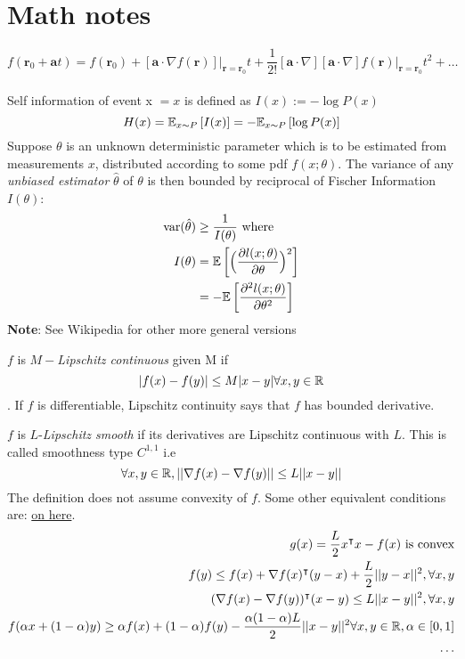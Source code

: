   \section{Math notes}
  \begin{equation}
    f(\boldsymbol{r}_0+\boldsymbol{a}t) = f(\boldsymbol{r}_0) +  [\boldsymbol{a}
      \cdot \nabla f(\boldsymbol{r})] \Big|_{\boldsymbol{r}=\boldsymbol{r}_0}t 
        + \frac{1}{2!} [\boldsymbol{a} \cdot \nabla][\boldsymbol{a} \cdot
          \nabla]f(\boldsymbol{r}) \Big|_{\boldsymbol{r}=
            \boldsymbol{r}_0} t^2 + \ldots
  \end{equation}
   \\
  Self information of event x $= x$ is defined as $I(x) := -\log P(x)$
  $$
  H(x) = \mathbb{E}_{x \sim P}\left[I(x)\right] = -\mathbb{E}_{x \sim P}\left[\log P(x)\right]
  $$
   \cite{math-stat16} 
  Suppose $\theta$ is an unknown deterministic parameter which is to be estimated from
  measurements $x$, distributed according to some pdf $f(x; \theta)$. The variance of any 
  \textit{unbiased estimator} $\hat{\theta}$ of $\theta$ is then bounded by reciprocal of
  Fischer Information $I(\theta)$:
  \begin{align}
    \text{var}(\hat{\theta}) &\geq \frac{1}{I(\theta)} \text{ where }\nonumber\\
    I(\theta) &= \mathbb{E}\left[\Big(\frac{\partial l(x; \theta)}{\partial \theta}\Big)^2\right] \nonumber\\
         &= -\mathbb{E}\left[\frac{\partial^2 l(x; \theta)}{\partial \theta^2}\right] \nonumber
  \end{align}
  {\bf Note}: See Wikipedia for other more general versions

  $f$ is $M-$\emph{Lipschitz continuous} given M if 
  $$|f(x) - f(y)| \leq M|x-y| \forall x,y \in \mathbb{R}$$. 
  If $f$ is differentiable, Lipschitz continuity
  says that $f$ has bounded derivative. 

  $f$ is $L$-\emph{Lipschitz smooth} if its derivatives are Lipschitz continuous
  with $L$. This is called smoothness type $C^{1,1}$ i.e 
  $$\forall x, y \in \mathbb{R}, ||\nabla f(x) - \nabla f(y)|| \leq L||x-y||$$
  The definition does not assume convexity of $f$. Some other equivalent conditions
  are: \href{https://xingyuzhou.org/blog/notes/Lipschitz-gradient}{on here}.
  \begin{align}
    g(x) = \frac{L}{2}x^\intercal x - f(x) \text{ is convex} \\
    f(y) \leq f(x) + \nabla f(x)^\intercal (y-x) + \frac{L}{2}||y-x||^2, \forall x,y 
      \label{eqn:quad_upper}\\
    (\nabla f(x) - \nabla f(y))^\intercal (x-y) \leq L||x-y||^2, \forall x,y \\
    f(\alpha x + (1 - \alpha)y) \geq \alpha f(x) + (1 - \alpha)f(y) - 
                                  \frac{\alpha(1 - \alpha)L}{2}||x-y||^2 
                                  \forall x,y \in \mathbb{R}, \alpha \in [0, 1]\\
    \cdots
  \end{align}

